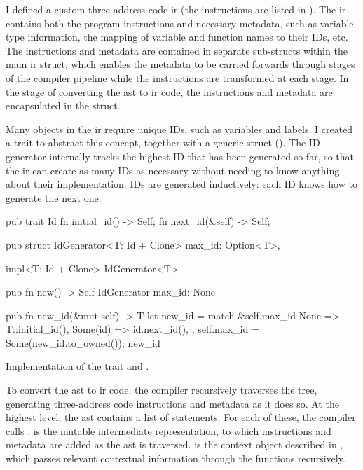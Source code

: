 \documentclass[00-main.tex]{subfiles}
\begin{document}
I defined a custom three-address code \gls{ir} (the instructions are listed in ).
The \gls{ir} contains both the program instructions and necessary metadata, such as variable type information, the mapping of variable and function names to their IDs, etc.
The instructions and metadata are contained in separate sub-structs within the main \gls{ir} struct, which enables the metadata to be carried forwards through stages of the compiler pipeline while the instructions are transformed at each stage.
In the stage of converting the \gls{ast} to \gls{ir} code, the instructions and metadata are encapsulated in the  struct.

Many objects in the \gls{ir} require unique IDs, such as variables and labels.
I created a  trait to abstract this concept, together with a generic  struct ().
The ID generator internally tracks the highest ID that has been generated so far, so that the \gls{ir} can create as many IDs as necessary without needing to know anything about their implementation.
IDs are generated inductively: each ID knows how to generate the next one.

\begin{listing}[!ht]
  \begin{RustListing}
    pub trait Id {
        fn initial_id() -> Self;
        fn next_id(&self) -> Self;
    }

    pub struct IdGenerator<T: Id + Clone> {
        max_id: Option<T>,
    }

    impl<T: Id + Clone> IdGenerator<T> {
        pub fn new() -> Self {
            IdGenerator { max_id: None }
        }

        pub fn new_id(&mut self) -> T {
            let new_id = match &self.max_id {
                None => T::initial_id(),
                Some(id) => id.next_id(),
            };
            self.max_id = Some(new_id.to_owned());
            new_id
        }
    }
  \end{RustListing}
  \caption{Implementation of the  trait and .}
  \label{lst:Id and IdGenerator implementation}
\end{listing}


To convert the \gls{ast} to \gls{ir} code, the compiler recursively traverses the tree, generating three-address code instructions and metadata as it does so.
At the highest level, the \gls{ast} contains a list of statements.
For each of these, the compiler calls .
 is the mutable intermediate representation, to which instructions and metadata are added as the \gls{ast} is traversed.
 is the context object described in , which passes relevant contextual information through the functions recursively.
\end{document}
